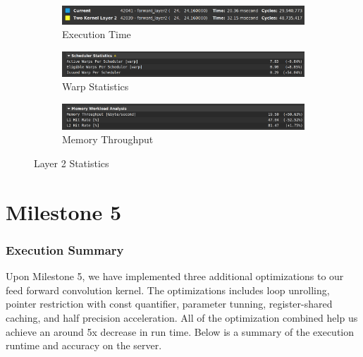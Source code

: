 \documentclass{article}
\begin{document}
\begin{figure}[H]
    \centering
    \begin{subfigure}[b]{\linewidth}
        \includegraphics[width=\linewidth]{ms4_layer2_runtime}
        \caption{Execution Time}
    \end{subfigure}
    \begin{subfigure}[b]{\linewidth}
        \includegraphics[width=\linewidth]{ms4_layer2_warp}
        \caption{Warp Statistics}
    \end{subfigure}
    \begin{subfigure}[b]{\linewidth}
        \includegraphics[width=\linewidth]{ms4_layer2_mem}
        \caption{Memory Throughput}
    \end{subfigure}
    \caption{Layer 2 Statistics}
\end{figure}

\part*{Milestone 5}
\setcounter{section}{0}

\section{Execution Summary}
Upon Milestone 5, we have implemented three additional optimizations to our feed forward
convolution kernel. The optimizations includes loop unrolling, pointer restriction with
const quantifier, parameter tunning, register-shared caching, and half precision acceleration.
All of the optimization combined help us achieve an around 5x decrease in run time.
Below is a summary of the execution runtime and accuracy on the server.
\end{document}
